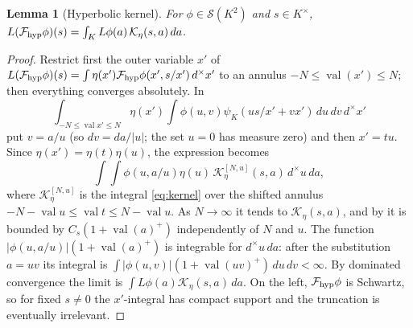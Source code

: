 \documentclass[11pt,oneside,notitlepage]{book}
\numberwithin{equation}{section}
\theoremstyle{plain}
\newtheorem{lemma}[theorem]{Lemma}
\theoremstyle{definition}
\newcommand{\cS}{\mathcal{S}}
\newcommand{\val}{\operatorname{val}}
\begin{document}
\begin{lemma}[Hyperbolic kernel]\label{lem:hyp-kernel}
For $\phi\in\cS(K^2)$ and $s\in K^\times$, $L(\mathcal F_{\rm hyp}\phi)(s)=\int_KL\phi(a)\,\mathcal K_\eta(s,a)\,da$.
\end{lemma}
\begin{proof}
Restrict first the outer variable $x'$ of $L(\mathcal F_{\rm hyp}\phi)(s)=\int\eta(x')\mathcal F_{\rm hyp}\phi(x',s/x')\,d^\times x'$ to an annulus $-N\le\val(x')\le N$; then everything converges absolutely. In
\[\int_{-N\le\val x'\le N}\eta(x')\int\phi(u,v)\psi_K(us/x'+vx')\,du\,dv\,d^\times x'\]
put $v=a/u$ (so $dv=da/|u|$; the set $u=0$ has measure zero) and then $x'=tu$. Since $\eta(x')=\eta(t)\eta(u)$, the expression becomes
\[\int\!\!\int\phi(u,a/u)\eta(u)\,\mathcal K^{[N,u]}_\eta(s,a)\,d^\times u\,da,\]
where $\mathcal K^{[N,u]}_\eta$ is the integral \eqref{eq:kernel} over the shifted annulus $-N-\val u\le\val t\le N-\val u$. As $N\to\infty$ it tends to $\mathcal K_\eta(s,a)$, and by  it is bounded by $C_s(1+\val(a)^+)$ independently of $N$ and $u$. The function $|\phi(u,a/u)|(1+\val(a)^+)$ is integrable for $d^\times u\,da$: after the substitution $a=uv$ its integral is $\int|\phi(u,v)|(1+\val(uv)^+)\,du\,dv<\infty$. By dominated convergence the limit is $\int L\phi(a)\mathcal K_\eta(s,a)\,da$. On the left, $\mathcal F_{\rm hyp}\phi$ is Schwartz, so for fixed $s\ne0$ the $x'$-integral has compact support and the truncation is eventually irrelevant.
\end{proof}
\end{document}
